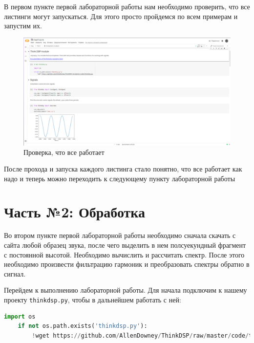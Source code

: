 \documentclass[a4paper]{article}
\begin{document}
            В первом пункте первой лабораторной работы нам необходимо проверить, что все листинги могут запускаться. Для этого просто пройдемся по всем примерам и запустим их.
            
            \begin{figure}[h]
                \centering
                \includegraphics[width=\textwidth]{Screen_check.png}
                \caption{Проверка, что все работает}
                \label{fig:check_it_works}
            \end{figure}
            
            После прохода и запуска каждого листинга стало понятно, что все работает как надо и теперь можно переходить к следующему пункту лабораторной работы
    
    \newpage
        \section{Часть №2: Обработка}
            
            Во втором пункте первой лабораторной работы необходимо сначала скачать с сайта любой образец звука, после чего выделить в нем полсуекундный фрагмент с постоянной высотой. Необходимо вычислить и рассчитать спектр. После этого необходимо произвести фильтрацию гармоник и преобразовать спектры обратно в сигнал.
            
            Перейдем к выполнению лабораторной работы. Для начала подключим к нашему проекту \texttt{thinkdsp.py}, чтобы в дальнейшем работать с ней:
            
\begin{lstlisting}[language=Python, caption= Подключение \texttt{thinkdsp.py}]
    import os
    if not os.path.exists('thinkdsp.py'):
        !wget https://github.com/AllenDowney/ThinkDSP/raw/master/code/thinkdsp.py
\end{lstlisting}    
            
\end{document}
